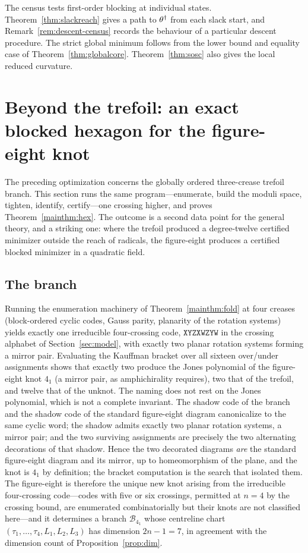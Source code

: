 The census tests first-order blocking at individual states. Theorem~\ref{thm:slackreach} gives a path to $\theta^\dagger$ from each slack start, and Remark~\ref{rem:descent-census} records the behaviour of a particular descent procedure. The strict global minimum follows from the lower bound and equality case of Theorem~\ref{thm:globalcore}. Theorem~\ref{thm:sosc} also gives the local reduced curvature.

\section{Beyond the trefoil: an exact blocked hexagon for the figure-eight knot}\label{sec:figure8}

The preceding optimization concerns the globally ordered three-crease trefoil branch. This section runs the same program---enumerate, build the moduli space, tighten, identify, certify---one crossing higher, and proves Theorem~\ref{mainthm:hex}. The outcome is a second data point for the general theory, and a striking one: where the trefoil produced a degree-twelve certified minimizer outside the reach of radicals, the figure-eight produces a certified blocked minimizer in a quadratic field.

\subsection{The branch}
Running the enumeration machinery of Theorem~\ref{mainthm:fold} at four creases (block-ordered cyclic codes, Gauss parity, planarity of the rotation systems) yields exactly one irreducible four-crossing code, $\mathtt{XYZXWZYW}$ in the crossing alphabet of Section~\ref{sec:model}, with exactly two planar rotation systems forming a mirror pair. Evaluating the Kauffman bracket over all sixteen over/under assignments shows that exactly two produce the Jones polynomial of the figure-eight knot $4_1$ (a mirror pair, as amphichirality requires), two that of the trefoil, and twelve that of the unknot. The naming does not rest on the Jones polynomial, which is not a complete invariant. The shadow code of the branch and the shadow code of the standard figure-eight diagram canonicalize to the same cyclic word; the shadow admits exactly two planar rotation systems, a mirror pair; and the two surviving assignments are precisely the two alternating decorations of that shadow. Hence the two decorated diagrams \emph{are} the standard figure-eight diagram and its mirror, up to homeomorphism of the plane, and the knot is $4_1$ by definition; the bracket computation is the search that isolated them. The figure-eight is therefore the unique new knot arising from the irreducible four-crossing code---codes with five or six crossings, permitted at $n=4$ by the crossing bound, are enumerated combinatorially but their knots are not classified here---and it determines a branch $\mathcal B_{4_1}$ whose centreline chart $(\tau_1,\ldots,\tau_4,L_1,L_2,L_3)$ has dimension $2n-1=7$, in agreement with the dimension count of Proposition~\ref{prop:dim}.


